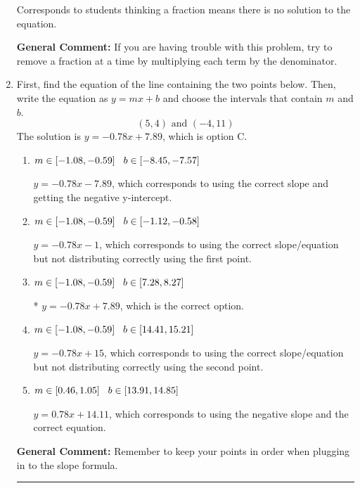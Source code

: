 \documentclass{extbook}[14pt]
\newcommand{\litem}[1]{\item #1

\rule{\textwidth}{0.4pt}}
\begin{document}
\begin{enumerate}
{\begin{enumerate}[label=\Alph*.]
Corresponds to students thinking a fraction means there is no solution to the equation.
\end{enumerate}

\textbf{General Comment:} If you are having trouble with this problem, try to remove a fraction at a time by multiplying each term by the denominator.
}
\litem{
First, find the equation of the line containing the two points below. Then, write the equation as $ y=mx+b $ and choose the intervals that contain $m$ and $b$.
\[ (5, 4) \text{ and } (-4, 11) \]
The solution is \( y = -0.78x + 7.89 \), which is option C.\begin{enumerate}[label=\Alph*.]
\item \( m \in [-1.08, -0.59] \hspace*{3mm} b \in [-8.45, -7.57] \)

 $y = -0.78x -7.89$, which corresponds to using the correct slope and getting the negative y-intercept.
\item \( m \in [-1.08, -0.59] \hspace*{3mm} b \in [-1.12, -0.58] \)

 $y = -0.78x -1$, which corresponds to using the correct slope/equation but not distributing correctly using the first point.
\item \( m \in [-1.08, -0.59] \hspace*{3mm} b \in [7.28, 8.27] \)

* $y = -0.78x + 7.89$, which is the correct option.
\item \( m \in [-1.08, -0.59] \hspace*{3mm} b \in [14.41, 15.21] \)

 $y = -0.78x + 15$, which corresponds to using the correct slope/equation but not distributing correctly using the second point.
\item \( m \in [0.46, 1.05] \hspace*{3mm} b \in [13.91, 14.85] \)

 $y = 0.78x + 14.11$, which corresponds to using the negative slope and the correct equation.
\end{enumerate}

\textbf{General Comment:} Remember to keep your points in order when plugging in to the slope formula.
}
\end{enumerate}
\end{document}
